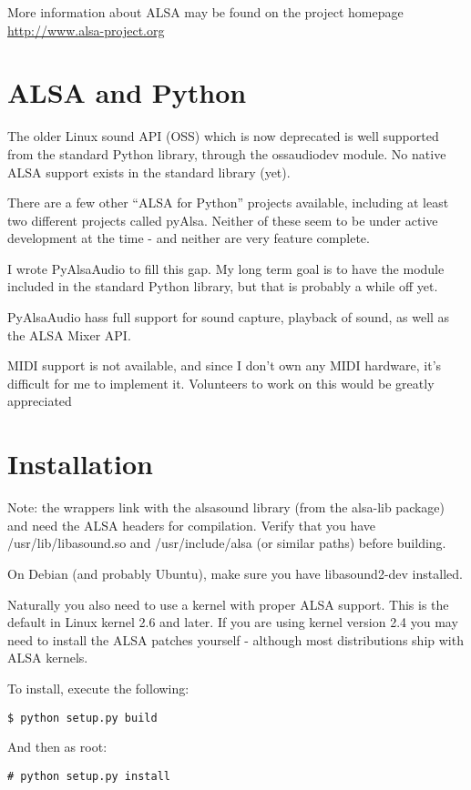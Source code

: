 \documentclass{howto}
\begin{document}
More information about ALSA may be found on the project homepage 
\url{http://www.alsa-project.org}

\section{ALSA and Python}

The older Linux sound API (OSS) which is now deprecated is well
supported from the standard Python library, through the ossaudiodev
module. No native ALSA support exists in the standard library (yet).

There are a few other ``ALSA for Python'' projects available,
including at least two different projects called pyAlsa. Neither of
these seem to be under active development at the time - and neither
are very feature complete.

I wrote PyAlsaAudio to fill this gap. My long term goal is to have the
module included in the standard Python library, but that is probably a
while off yet.

PyAlsaAudio hass full support for sound capture, playback of sound, as
well as the ALSA Mixer API.

MIDI support is not available, and since I don't own any MIDI
hardware, it's difficult for me to implement it. Volunteers to work on
this would be greatly appreciated
\section{Installation}

Note: the wrappers link with the alsasound library (from the alsa-lib
package) and need the ALSA headers for compilation.  Verify that you
have /usr/lib/libasound.so and /usr/include/alsa (or
similar paths) before building.

On Debian (and probably Ubuntu), make sure you have libasound2-dev installed.

Naturally you also need to use a kernel with proper ALSA support. This
is the default in Linux kernel 2.6 and later. If you are using kernel
version 2.4 you may need to install the ALSA patches yourself -
although most distributions ship with ALSA kernels.

To install, execute the following: \\
\begin{verbatim}
$ python setup.py build
\end{verbatim}

And then as root: \\
\begin{verbatim}
# python setup.py install
\end{verbatim}


\end{document}
